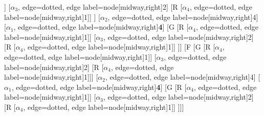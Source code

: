 \begin{forest}
[B
	[F
		[G
			[R
				[$\alpha_{4}$, edge=dotted, edge label={node[midway,right]{1}}]]
			[$\alpha_{3}$, edge=dotted, edge label={node[midway,right]{2}}]
			[R
				[$\alpha_{4}$, edge=dotted, edge label={node[midway,right]{1}}]]
		]
		[$\alpha_{2}$, edge=dotted, edge label={node[midway,right]{4}}]
		[$\alpha_{1}$, edge=dotted, edge label={node[midway,right]{\textbf{4}}}]
		[G
			[R
				[$\alpha_{4}$, edge=dotted, edge label={node[midway,right]{1}}]]
			[$\alpha_{3}$, edge=dotted, edge label={node[midway,right]{2}}]
			[R
				[$\alpha_{4}$, edge=dotted, edge label={node[midway,right]{1}}]]
		]]
	[F
		[G
			[R
				[$\alpha_{4}$, edge=dotted, edge label={node[midway,right]{1}}]]
			[$\alpha_{3}$, edge=dotted, edge label={node[midway,right]{2}}]
			[R
				[$\alpha_{4}$, edge=dotted, edge label={node[midway,right]{1}}]]]
		[$\alpha_{2}$, edge=dotted, edge label={node[midway,right]{4}}]
		[$\alpha_{1}$, edge=dotted, edge label={node[midway,right]{\textbf{4}}}]
		[G
			[R
				[$\alpha_{4}$, edge=dotted, edge label={node[midway,right]{1}}]]
			[$\alpha_{3}$, edge=dotted, edge label={node[midway,right]{2}}]
			[R
				[$\alpha_{4}$, edge=dotted, edge label={node[midway,right]{1}}]]
	]]]
\end{forest}
